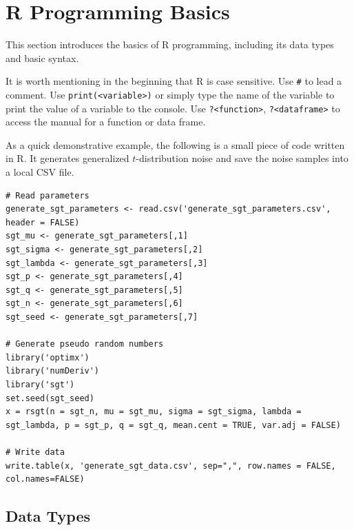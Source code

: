 \section{R Programming Basics} \label{ch:r1:sec:rprogramming}

This section introduces the basics of R programming, including its data types and basic syntax.

It is worth mentioning in the beginning that R is case sensitive. Use \verb|#| to lead a comment. Use \verb|print(<variable>)| or simply type the name of the variable to print the value of a variable to the console. Use \verb|?<function>|, \verb|?<dataframe>| to access the manual for a function or data frame.

As a quick demonstrative example, the following is a small piece of code written in R. It generates generalized $t$-distribution noise and save the noise samples into a local CSV file.
\begin{lstlisting}
# Read parameters
generate_sgt_parameters <- read.csv('generate_sgt_parameters.csv', header = FALSE)
sgt_mu <- generate_sgt_parameters[,1]
sgt_sigma <- generate_sgt_parameters[,2]
sgt_lambda <- generate_sgt_parameters[,3]
sgt_p <- generate_sgt_parameters[,4]
sgt_q <- generate_sgt_parameters[,5]
sgt_n <- generate_sgt_parameters[,6]
sgt_seed <- generate_sgt_parameters[,7]

# Generate pseudo random numbers
library('optimx')
library('numDeriv')
library('sgt')
set.seed(sgt_seed)
x = rsgt(n = sgt_n, mu = sgt_mu, sigma = sgt_sigma, lambda = sgt_lambda, p = sgt_p, q = sgt_q, mean.cent = TRUE, var.adj = FALSE)

# Write data
write.table(x, 'generate_sgt_data.csv', sep=",", row.names = FALSE, col.names=FALSE)
\end{lstlisting}

\subsection{Data Types}

